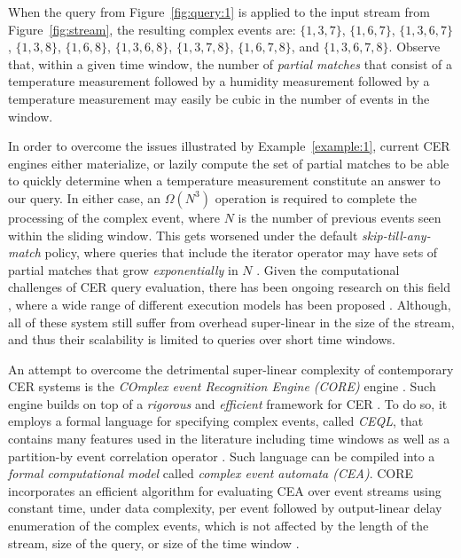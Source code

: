 \begin{example}
When the query from Figure~\ref{fig:query:1} is applied to the input stream from Figure~\ref{fig:stream}, the resulting complex events are: $\{ 1, 3, 7 \}$, $\{ 1, 6, 7 \}$, $\{ 1, 3, 6, 7 \}$, $\{ 1, 3, 8 \}$, $\{ 1, 6, 8 \}$, $\{ 1, 3, 6, 8 \}$, $\{ 1, 3, 7, 8\}$, $\{ 1, 6, 7, 8\}$, and $\{ 1, 3, 6, 7, 8\}$. Observe that, within a given time window, the number of \emph{partial matches} that consist of a temperature measurement followed by a humidity measurement followed by a temperature measurement may easily be cubic in the number of events in the window.
\end{example}

In order to overcome the issues illustrated by Example~\ref{example:1}, current CER engines either materialize, or lazily compute the set of partial matches to be able to quickly determine when a temperature measurement constitute an answer to our query. In either case, an $\Omega(N^{3})$ operation is required to complete the processing of the complex event, where $N$ is the number of previous events seen within the sliding window. This gets worsened under the default \emph{skip-till-any-match} \cite{skip-till-any-match} policy, where queries that include the iterator operator may have sets of partial matches that grow \emph{exponentially} in $N$ \cite{core}.  Given the computational challenges of CER query evaluation, there has been ongoing research on this field \cite{research-evaluation-query, formal-framework-cer}, where a wide range of different execution models has been proposed \cite{survey-systems-1, survey-systems-2}. Although, all of these system still suffer from overhead super-linear in the size of the stream, and thus their scalability is limited to queries over short time windows.

An attempt to overcome the detrimental super-linear complexity of contemporary CER systems is the \emph{COmplex event Recognition Engine (CORE)} engine \cite{core}. Such engine builds on top of a \emph{rigorous} and \emph{efficient} framework for CER \cite{formal-framework-cep, formal-framework-cer}. To do so, it employs a formal language for specifying complex events, called \emph{CEQL}, that contains many features used in the literature including time windows as well as a partition-by event correlation operator \cite{on-the-expressiveness, core}. Such language can be compiled into a \emph{formal computational model} called \emph{complex event automata (CEA)}. CORE incorporates an efficient algorithm for evaluating CEA over event streams using constant time, under data complexity, per event followed by output-linear delay enumeration of the complex events, which is not affected by the length of the stream, size of the query, or size of the time window \cite{formal-framework-cer, core}.

